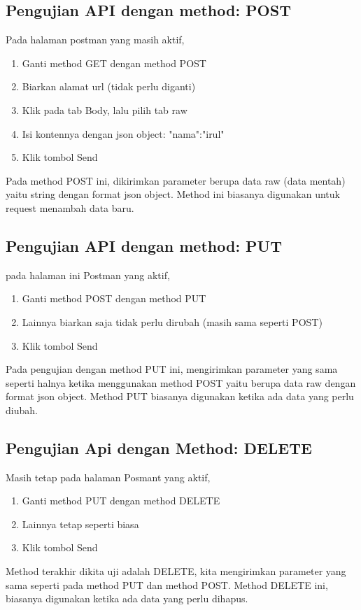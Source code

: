\documentclass[12pt,a4paper]{article}
\begin{document}
\subsection{Pengujian API dengan method: POST}
Pada halaman postman yang masih aktif,
\begin{enumerate}
\item Ganti method GET dengan method POST
\item Biarkan alamat url (tidak perlu diganti)
\item Klik pada tab Body, lalu pilih tab raw
\item Isi kontennya dengan json object: {"nama":"irul"}
\item Klik tombol Send
\end{enumerate}
Pada method POST ini, dikirimkan  parameter berupa data raw (data mentah) yaitu string dengan format json object. Method ini biasanya digunakan untuk request menambah data baru. 


\subsection{Pengujian API dengan method: PUT}
pada halaman ini Postman yang aktif,
\begin{enumerate}
\item Ganti method POST dengan method PUT
\item Lainnya biarkan saja tidak perlu dirubah (masih sama seperti POST)
\item Klik tombol Send
\end{enumerate}
Pada pengujian dengan method PUT ini, mengirimkan parameter yang sama seperti halnya ketika menggunakan method POST yaitu berupa data raw dengan format json object. Method PUT biasanya digunakan ketika ada data yang perlu diubah. 

\subsection{Pengujian Api dengan Method: DELETE}
Masih tetap pada halaman Posmant yang aktif,
\begin{enumerate}
\item Ganti method PUT dengan method DELETE
\item Lainnya tetap seperti biasa 
\item Klik tombol Send
\end{enumerate}
Method terakhir dikita uji adalah DELETE, kita mengirimkan parameter yang sama seperti pada method PUT dan method POST. Method DELETE ini, biasanya digunakan ketika ada data yang perlu dihapus.
\end{document}
